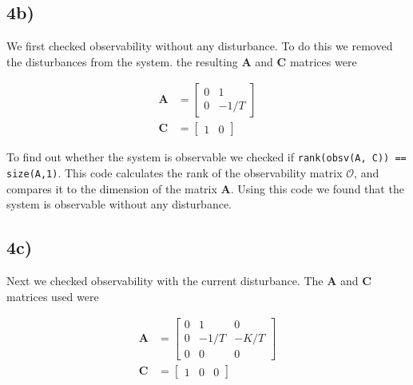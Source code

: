 \subsection{4b)} \label{subsec:4b}

 We first checked observability without any disturbance. To do this we removed the disturbances from the system. the resulting $\mathbf{A}$ and $\mathbf{C}$ matrices were

\begin{subequations}
    \begin{align}
        \mathbf{A} &= \begin{bmatrix}
        0 & 1 \\
        0 & -1/T
        \end{bmatrix} \\
        \mathbf{C} &= \begin{bmatrix}
        1 & 0
        \end{bmatrix}
    \end{align}
\end{subequations}

To find out whether the system is observable we checked if \texttt{rank(obsv(A, C)) == size(A,1)}. This code calculates the rank of the observability matrix $\mathcal{O}$, and compares it to the dimension of the matrix $\mathbf{A}$. Using this code we found that the system is observable without any disturbance.

\subsection{4c)}

Next we checked observability with the current disturbance. The $\mathbf{A}$ and $\mathbf{C}$ matrices used were

\begin{subequations}
    \begin{align}
        \mathbf{A} &= \begin{bmatrix}
        0 & 1 & 0 \\
        0 & -1/T & -K/T \\
        0 & 0 & 0
        \end{bmatrix} \\
        \mathbf{C} &= \begin{bmatrix}
        1 & 0 & 0
        \end{bmatrix}
    \end{align}
\end{subequations}

